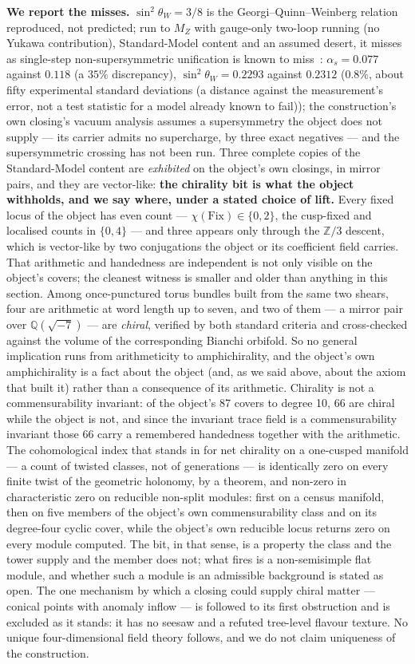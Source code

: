 \documentclass[11pt,a4paper]{article}
\theoremstyle{definition}
\theoremstyle{remark}
\newcommand{\Q}{\mathbb{Q}}
\newcommand{\Z}{\mathbb{Z}}
\begin{document}
\textbf{We report the misses.} $\sin^2\theta_W = 3/8$ is the Georgi--Quinn--Weinberg relation~\cite{gqw} reproduced, not
predicted; run to $M_Z$ with gauge-only two-loop running (no Yukawa contribution), Standard-Model content and an assumed desert, it misses as single-step
non-supersymmetric unification is known to miss~\cite{adf,ll}: $\alpha_s = 0.077$ against $0.118$ (a $35\%$ discrepancy),
$\sin^2\theta_W = 0.2293$ against $0.2312$ ($0.8\%$, about fifty experimental standard deviations (a distance against the measurement's error, not a test statistic for a model already known to fail)); the construction's own
closing's vacuum analysis assumes a supersymmetry the object does not supply --- its carrier admits no supercharge, by three exact negatives --- and the supersymmetric crossing has not been run. Three complete copies of the Standard-Model content are \emph{exhibited} on the object's own closings, in mirror pairs,
and they are vector-like: \textbf{the chirality bit is what the object withholds, and we say where, under a stated choice of lift.} Every fixed locus of the
object has even count --- $\chi(\mathrm{Fix}) \in \{0,2\}$, the cusp-fixed and localised counts in $\{0,4\}$ --- and three appears
only through the $\Z/3$ descent, which is vector-like by two conjugations the object or its coefficient field carries. That arithmetic and handedness are independent is not only visible on the object's covers; the cleanest witness is
smaller and older than anything in this section. Among once-punctured torus bundles built from the same two shears,
four are arithmetic at word length up to seven, and two of them --- a mirror pair over $\Q(\sqrt{-7})$ --- are
\emph{chiral}, verified by both standard criteria and cross-checked against the volume of the corresponding Bianchi
orbifold. So no general implication runs from arithmeticity to amphichirality, and the object's own amphichirality is
a fact about the object (and, as we said above, about the axiom that built it) rather than a consequence of its
arithmetic. Chirality is not a commensurability invariant: of the object's 87 covers to degree 10, 66 are chiral while the object
is not, and since the invariant trace field is a commensurability invariant those 66 carry a remembered handedness
together with the arithmetic. The cohomological index that stands in for net chirality on a one-cusped manifold --- a count of twisted classes, not of generations --- is identically zero on every finite twist of the geometric holonomy, by a theorem, and non-zero in characteristic zero on reducible non-split modules: first on a census manifold, then on five members of the object's own commensurability class and on its degree-four cyclic cover, while the object's own reducible locus returns zero on every module computed. The bit, in that sense, is a property the class and the tower supply and the member does not; what fires is a non-semisimple flat module, and whether such a module is an admissible background is stated as open. The one mechanism by which a closing could supply chiral matter --- conical points with anomaly inflow --- is followed to its first obstruction and is excluded as it stands: it has no seesaw and a refuted tree-level flavour texture.
No unique four-dimensional field theory follows, and we do not claim uniqueness of the construction.
\end{document}
